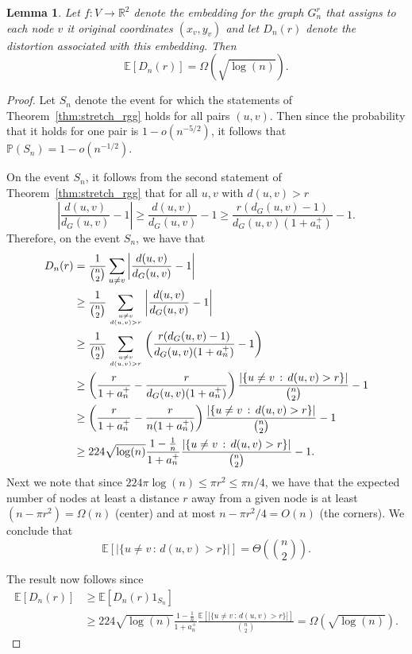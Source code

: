 \documentclass{article}
\newtheorem{lemma}[theorem]{Lemma}
\begin{document}
\begin{lemma}
Let $f : V \to \mathbb{R}^2$ denote the embedding for the graph $G_n^r$ that assigns to each node $v$ it original coordinates $(x_v,y_v)$ and let $D_n(r)$ denote the distortion associated with this embedding. Then
\[
	\mathbb{E}[D_n(r)] = \Omega\left(\sqrt{\log(n)}\right).
\]
\end{lemma}

\begin{proof}
Let $S_n$ denote the event for which the statements of Theorem~\ref{thm:stretch_rgg} holds for all pairs $(u,v)$. Then since the probability that it holds for one pair is $1 - o(n^{-5/2})$, it follows that $\mathbb{P}(S_n) = 1 - o(n^{-1/2})$.

On the event $S_n$, it follows from the second statement of Theorem~\ref{thm:stretch_rgg} that for all $u,v$ with $d(u,v) > r$
\[
	\left|\frac{d(u,v)}{d_G(u,v)} - 1\right| \ge \frac{d(u,v)}{d_G(u,v)} - 1
	\ge \frac{r(d_G(u,v) - 1)}{d_G(u,v)(1+a_n^+)} - 1.
\]
Therefore, on the event $S_n$, we have that
\begin{align*}
	D_n(r) &= \frac{1}{\binom{n}{2}} \sum_{u \ne v} \left|\frac{d(u,v)}{d_G(u,v)} - 1\right|\\
	&\ge \frac{1}{\binom{n}{2}} \sum_{u \ne v \atop d(u,v) > r} \left|\frac{d(u,v)}{d_G(u,v)} - 1\right|\\
	&\ge \frac{1}{\binom{n}{2}} \sum_{u \ne v \atop d(u,v) > r} \left(\frac{r(d_G(u,v) - 1)}{d_G(u,v)(1+a_n^+)} - 1\right)\\
	&\ge \left(\frac{r}{1 + a_n^+} - \frac{r}{d_G(u,v)(1+a_n^+)}\right) 
		\frac{|\{u \ne v \, :\, d(u,v) > r\}|}{\binom{n}{2}} - 1\\
	&\ge \left(\frac{r}{1 + a_n^+} - \frac{r}{n(1+a_n^+)}\right) 
			\frac{|\{u \ne v \, :\, d(u,v) > r\}|}{\binom{n}{2}} - 1\\
	&\ge 224 \sqrt{\log(n)} \frac{1 - \frac{1}{n}}{1 + a_n^+} \frac{|\{u \ne v \, :\, d(u,v) > r\}|}{\binom{n}{2}} - 1.
\end{align*}
Next we note that since $224 \pi \log(n) \le \pi r^2 \le \pi n/4$, we have that the expected number of nodes at least a distance $r$ away from a given node is at least $(n - \pi r^2) = \Omega(n)$ (center) and at most $n - \pi r^2/4 = O(n)$ (the corners). We conclude that
\[
	\mathbb{E}[|\{u \ne v \, :\, d(u,v) > r\}|] = \Theta\left(\binom{n}{2}\right).
\]

The result now follows since
\begin{align*}
	\mathbb{E}[D_n(r)] &\ge \mathbb{E}[D_n(r) 1_{S_n}] \\
	&\ge 224 \sqrt{\log(n)} \frac{1 - \frac{1}{n}}{1 + a_n^+} 
		\frac{\mathbb{E}[|\{u \ne v \, :\, d(u,v) > r\}|]}{\binom{n}{2}}
		= \Omega(\sqrt{\log(n)}).
\end{align*}
\end{proof}
\end{document}
